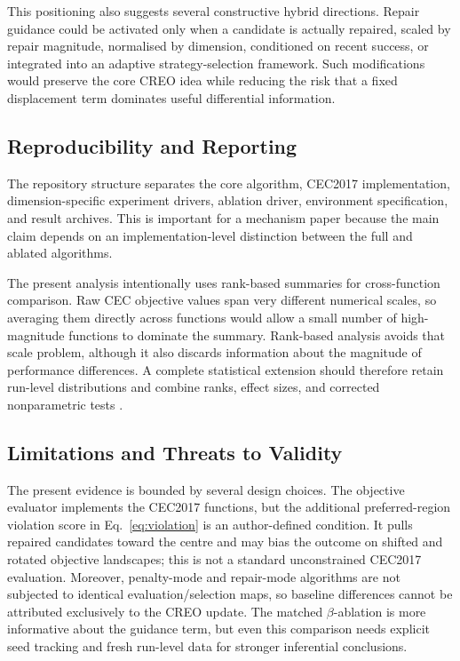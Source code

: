 \documentclass[a4paper,fleqn]{cas-sc}
\begin{document}
This positioning also suggests several constructive hybrid directions. Repair guidance could be activated only when a candidate is actually repaired, scaled by repair magnitude, normalised by dimension, conditioned on recent success, or integrated into an adaptive strategy-selection framework. Such modifications would preserve the core CREO idea while reducing the risk that a fixed displacement term dominates useful differential information.

\subsection{Reproducibility and Reporting}

The repository structure separates the core algorithm, CEC2017 implementation, dimension-specific experiment drivers, ablation driver, environment specification, and result archives. This is important for a mechanism paper because the main claim depends on an implementation-level distinction between the full and ablated algorithms.

The present analysis intentionally uses rank-based summaries for cross-function comparison. Raw CEC objective values span very different numerical scales, so averaging them directly across functions would allow a small number of high-magnitude functions to dominate the summary. Rank-based analysis avoids that scale problem, although it also discards information about the magnitude of performance differences. A complete statistical extension should therefore retain run-level distributions and combine ranks, effect sizes, and corrected nonparametric tests \cite{garcia2009nonparametric,derrac2011tutorial}.

\subsection{Limitations and Threats to Validity}

The present evidence is bounded by several design choices. The objective evaluator implements the CEC2017 functions, but the additional preferred-region violation score in Eq.~\eqref{eq:violation} is an author-defined condition. It pulls repaired candidates toward the centre and may bias the outcome on shifted and rotated objective landscapes; this is not a standard unconstrained CEC2017 evaluation. Moreover, penalty-mode and repair-mode algorithms are not subjected to identical evaluation/selection maps, so baseline differences cannot be attributed exclusively to the CREO update. The matched $\beta$-ablation is more informative about the guidance term, but even this comparison needs explicit seed tracking and fresh run-level data for stronger inferential conclusions.
\end{document}
